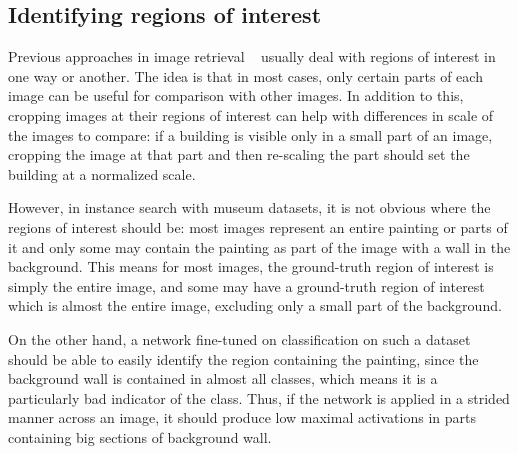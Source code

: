 \subsection{Identifying regions of interest}\label{sec:roi}
Previous approaches in image retrieval
~\cite{gordo_end--end_2016,salvador_faster_2016,tolias_particular_2015}
usually deal with regions of interest in one way or another.
The idea is that in most cases, only certain parts of each image can
be useful for comparison with other images. In addition to this,
cropping images at their regions of interest can help with differences
in scale of the images to compare: if a building is visible only in a small
part of an image, cropping the image at that part and then re-scaling
the part should set the building at a normalized scale.

However, in instance search with museum datasets, it is not obvious
where the regions of interest should be: most images represent an entire
painting or parts of it and only some may contain the painting as part
of the image with a wall in the background. This means for most images,
the ground-truth region of interest is simply the entire image, and some
may have a ground-truth region of interest which is almost the entire image,
excluding only a small part of the background.

On the other hand, a network fine-tuned on classification on such a dataset
should be able to easily identify the region containing the painting, since
the background wall is contained in almost all classes, which means it is a
particularly bad indicator of the class. Thus, if the network is applied in
a strided manner across an image, it should produce low maximal activations
in parts containing big sections of background wall.

